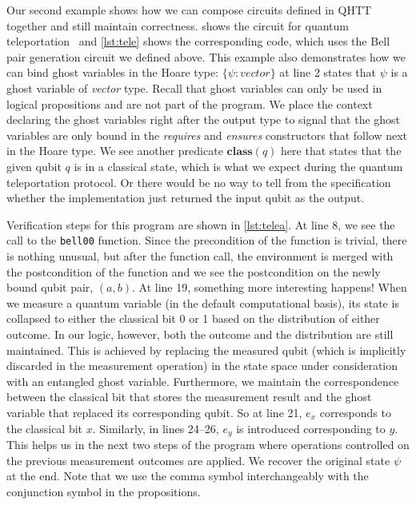 Our second example shows how we can compose circuits defined in QHTT together and still maintain correctness.  shows the circuit for quantum teleportation~\parencite{bennett93} and \cref{lst:tele} shows the corresponding code, which uses the Bell pair generation circuit we defined above. This example also demonstrates how we can bind ghost variables in the Hoare type: $\{\psi: \mathit{vector}\}$ at line 2 states that $\psi$ is a ghost variable of \textit{vector} type. Recall that ghost variables can only be used in logical propositions and are not part of the program. We place the context declaring the ghost variables right after the output type to signal that the ghost variables are only bound in the \textit{requires} and \textit{ensures} constructors that follow next in the Hoare type. We see another predicate $\mathbf{class}(q)$ here that states that the given qubit $q$ is in a classical state, which is what we expect during the quantum teleportation protocol. Or there would be no way to tell from the specification whether the implementation just returned the input qubit as the output.



Verification steps for this program are shown in \cref{lst:telea}. At line 8, we see the call to the \texttt{bell00} function. Since the precondition of the function is trivial, there is nothing unusual, but after the function call, the environment is merged with the postcondition of the function and we see the postcondition on the newly bound qubit pair, $(a, b)$. At line 19, something more interesting happens! When we measure a quantum variable (in the default computational basis), its state is collapsed to either the classical bit 0 or 1 based on the distribution of either outcome. In our logic, however, both the outcome and the distribution are still maintained. This is achieved by replacing the measured qubit (which is implicitly discarded in the measurement operation) in the state space under consideration with an entangled ghost variable. Furthermore, we maintain the correspondence between the classical bit that stores the measurement result and the ghost variable that replaced its corresponding qubit. So at line 21, $e_x$ corresponds to the classical bit $x$. Similarly, in lines 24--26, $e_y$ is introduced corresponding to $y$. This helps us in the next two steps of the program where operations controlled on the previous measurement outcomes are applied. We recover the original state $\psi$ at the end. Note that we use the comma symbol interchangeably with the conjunction symbol in the propositions.

